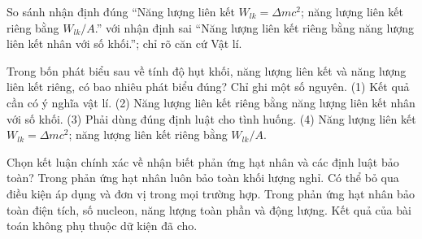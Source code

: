 \begin{bt}
So sánh nhận định đúng “Năng lượng liên kết $W_{lk}=\Delta m c^2$; năng lượng liên kết riêng bằng $W_{lk}/A$.” với nhận định sai “Năng lượng liên kết riêng bằng năng lượng liên kết nhân với số khối.”; chỉ rõ căn cứ Vật lí.
\end{bt}

\begin{ex}
Trong bốn phát biểu sau về tính độ hụt khối, năng lượng liên kết và năng lượng liên kết riêng, có bao nhiêu phát biểu đúng? Chỉ ghi một số nguyên. (1) Kết quả cần có ý nghĩa vật lí. (2) Năng lượng liên kết riêng bằng năng lượng liên kết nhân với số khối. (3) Phải dùng đúng định luật cho tình huống. (4) Năng lượng liên kết $W_{lk}=\Delta m c^2$; năng lượng liên kết riêng bằng $W_{lk}/A$.
\end{ex}

\begin{ex}
Chọn kết luận chính xác về nhận biết phản ứng hạt nhân và các định luật bảo toàn?
\choice
{Trong phản ứng hạt nhân luôn bảo toàn khối lượng nghỉ.}
{Có thể bỏ qua điều kiện áp dụng và đơn vị trong mọi trường hợp.}
{\True Trong phản ứng hạt nhân bảo toàn điện tích, số nucleon, năng lượng toàn phần và động lượng.}
{Kết quả của bài toán không phụ thuộc dữ kiện đã cho.}
\end{ex}

